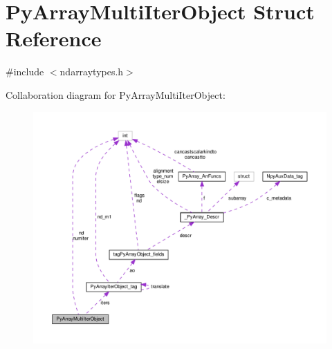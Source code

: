 \hypertarget{structPyArrayMultiIterObject}{}\section{Py\+Array\+Multi\+Iter\+Object Struct Reference}
\label{structPyArrayMultiIterObject}


{\ttfamily \#include $<$ndarraytypes.\+h$>$}



Collaboration diagram for Py\+Array\+Multi\+Iter\+Object\+:
\nopagebreak
\begin{figure}[H]
\begin{center}
\leavevmode
\includegraphics[width=350pt]{structPyArrayMultiIterObject__coll__graph}
\end{center}
\end{figure}
